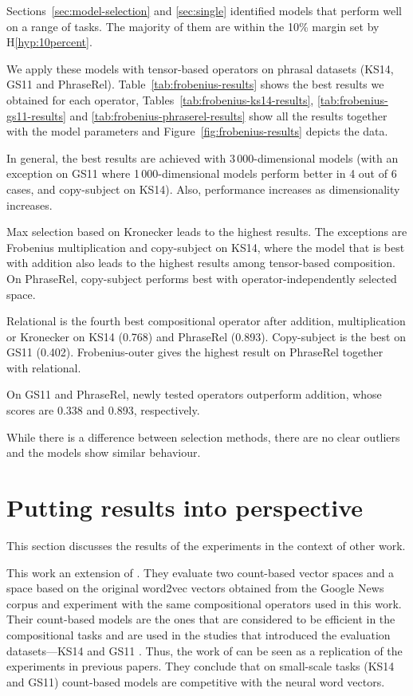 Sections~\ref{sec:model-selection} and \ref{sec:single} identified models that perform well on a range of tasks. The majority of them are within the 10\% margin set by H\ref{hyp:10percent}.



We apply these models with tensor-based operators on phrasal datasets (KS14, GS11 and PhraseRel). Table~\ref{tab:frobenius-results} shows the best results we obtained for each operator, Tables~\ref{tab:frobenius-ks14-results}, \ref{tab:frobenius-gs11-results} and \ref{tab:frobenius-phraserel-results} show all the results together with the model parameters and Figure~\ref{fig:frobenius-results} depicts the data.

In general, the best results are achieved with 3\,000-dimensional models (with an exception on GS11 where 1\,000-dimensional models perform better in 4 out of 6 cases, and copy-subject on KS14). Also, performance increases as dimensionality increases.

Max selection based on Kronecker leads to the highest results. The exceptions are Frobenius multiplication and copy-subject on KS14, where the model that is best with addition also leads to the highest results among tensor-based composition. On PhraseRel, copy-subject performs best with operator-independently selected space.

Relational is the fourth best compositional operator after addition, multiplication or Kronecker on KS14 (0.768) and PhraseRel (0.893). Copy-subject is the best on GS11 (0.402). Frobenius-outer gives the highest result on PhraseRel together with relational.

On GS11 and PhraseRel, newly tested operators outperform addition, whose scores are 0.338 and 0.893, respectively.

While there is a difference between selection methods, there are no clear outliers and the models show similar behaviour.

\section{Putting results into perspective}
\label{sec:comp-with-other}

This section discusses the results of the experiments in the context of other work.

This work an extension of . They evaluate two count-based vector spaces and a space based on the original word2vec vectors obtained from the Google News corpus \cite{mikolov2013distributed} and experiment with the same compositional operators used in this work. Their count-based models are the ones that are considered to be efficient in the compositional tasks and are used in the studies that introduced the evaluation datasets---KS14 \cite{kartsadrqpl2014} and GS11 \cite{Grefenstette:2011:ESC:2145432.2145580}. Thus, the work of  can be seen as a replication of the experiments in previous papers. They conclude that on small-scale tasks (KS14 and GS11) count-based models are competitive with the neural word vectors.

